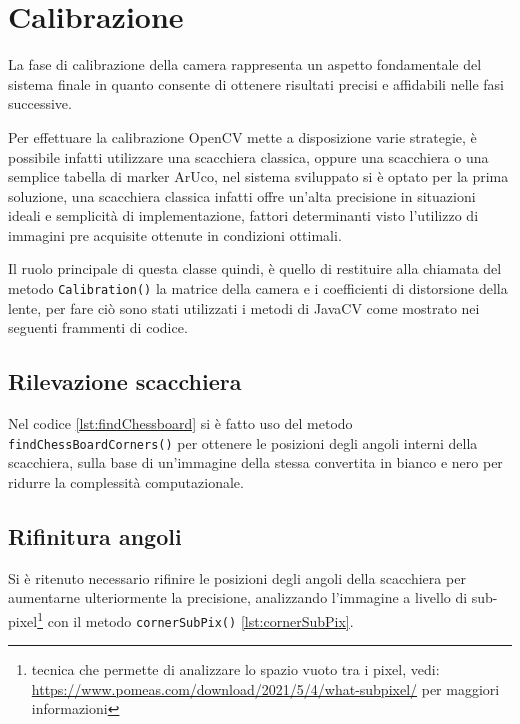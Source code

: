 \documentclass[12pt,a4paper,openright,twoside]{book}
\begin{document}





\section{Calibrazione}
La fase di calibrazione della camera rappresenta un aspetto fondamentale del sistema finale in quanto consente di ottenere risultati precisi e affidabili nelle fasi successive.

Per effettuare la calibrazione OpenCV mette a disposizione varie strategie, è possibile infatti utilizzare una scacchiera classica, oppure una scacchiera o una semplice tabella di marker ArUco, nel sistema sviluppato si è optato per la prima soluzione, una scacchiera classica infatti offre un'alta precisione in situazioni ideali e semplicità di implementazione, fattori determinanti visto l'utilizzo di immagini pre acquisite ottenute in condizioni ottimali.

Il ruolo principale di questa classe quindi, è quello di restituire alla chiamata del metodo \texttt{Calibration()} la matrice della camera e i coefficienti di distorsione della lente, per fare ciò sono stati utilizzati i metodi di JavaCV come mostrato nei seguenti frammenti di codice.

\subsection{Rilevazione scacchiera}
Nel codice \cref{lst:findChessboard} si è fatto uso del metodo \texttt{findChessBoardCorners()} per ottenere le posizioni degli angoli interni della scacchiera, sulla base di un'immagine della stessa convertita in bianco e nero per ridurre la complessità computazionale.
	
\subsection{Rifinitura angoli}
Si è ritenuto necessario rifinire le posizioni degli angoli della scacchiera per aumentarne ulteriormente la precisione, analizzando l'immagine a livello di sub-pixel\footnote{tecnica che permette di analizzare lo spazio vuoto tra i pixel, vedi: \url{https://www.pomeas.com/download/2021/5/4/what-subpixel/} per maggiori informazioni} con il metodo \texttt{cornerSubPix()} \cref{lst:cornerSubPix}.

\end{document}
